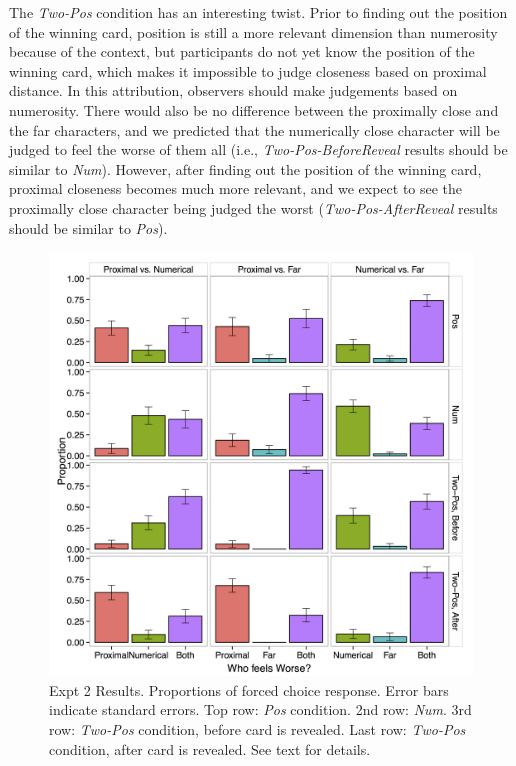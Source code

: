 \documentclass[10pt,letterpaper]{article}
\begin{document}
The \textit{Two-Pos} condition has an interesting twist. Prior to finding out the position of the winning card, position is still a more relevant dimension than numerosity because of the context, but participants do not yet know the position of the winning card, which makes it impossible to judge closeness based on proximal distance. In this attribution, observers should make judgements based on numerosity. There would also be no difference between the proximally close and the far characters, and we predicted that the numerically close character will be judged to feel the worse of them all (i.e., \textit{Two-Pos-BeforeReveal} results should be similar to \textit{Num}). However, after finding out the position of the winning card, proximal closeness becomes much more relevant, and we expect to see the proximally close character being judged the worst (\textit{Two-Pos-AfterReveal} results should be similar to \textit{Pos}).



\begin{figure}[htb!]
\includegraphics[width=\columnwidth]{images/cardCombined_forcedWorse.png}
\caption{ Expt 2 Results. Proportions of forced choice response. Error bars indicate standard errors. Top row: \textit{Pos} condition. 2nd row: \textit{Num}. 3rd row: \textit{Two-Pos} condition, before card is revealed. Last row: \textit{Two-Pos} condition, after card is revealed. See text for details.}
\label{Expt2ResultFig}
\end{figure}
\end{document}
